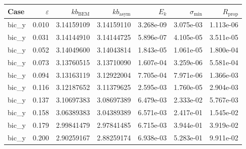 \begin{tabular}{lrrrrrr}
\hline
Case & $\varepsilon$ & $kb_{\mathrm{BEM}}$ & $kb_{\mathrm{asym}}$ & $E_k$ & $\sigma_{\min}$ & $R_{\mathrm{prop}}$ \\
\hline
bic_y & 0.010 & 3.14159109 & 3.14159110 & 3.268e-09 & 3.075e-03 & 1.113e-06 \\
bic_y & 0.031 & 3.14144910 & 3.14144725 & 5.896e-07 & 4.105e-05 & 3.511e-05 \\
bic_y & 0.052 & 3.14049600 & 3.14043814 & 1.843e-05 & 1.061e-05 & 1.800e-04 \\
bic_y & 0.073 & 3.13760515 & 3.13710090 & 1.607e-04 & 3.259e-06 & 5.581e-04 \\
bic_y & 0.094 & 3.13163119 & 3.12922004 & 7.705e-04 & 7.971e-06 & 1.366e-03 \\
bic_y & 0.116 & 3.12187652 & 3.11379625 & 2.595e-03 & 1.760e-05 & 2.904e-03 \\
bic_y & 0.137 & 3.10697383 & 3.08697389 & 6.479e-03 & 2.333e-02 & 5.767e-03 \\
bic_y & 0.158 & 3.06389383 & 3.04389389 & 6.571e-03 & 2.417e-01 & 1.545e-02 \\
bic_y & 0.179 & 2.99841479 & 2.97841485 & 6.715e-03 & 3.944e-01 & 3.919e-02 \\
bic_y & 0.200 & 2.90259167 & 2.88259174 & 6.938e-03 & 5.283e-01 & 9.911e-02 \\
\hline
\end{tabular}